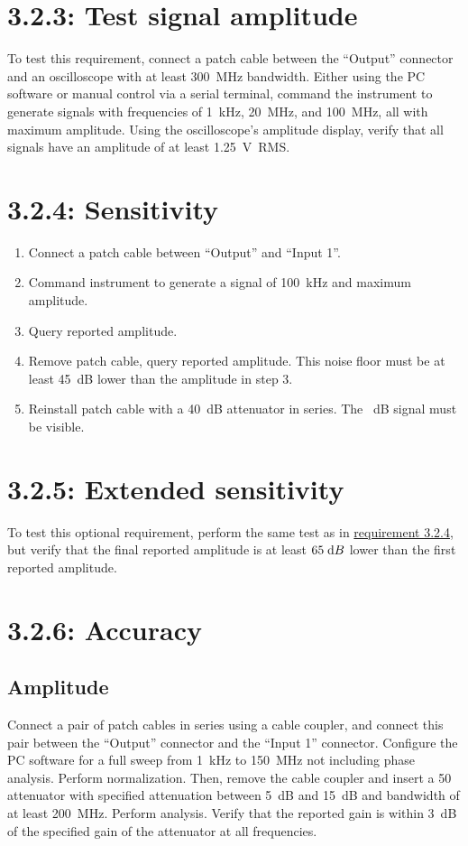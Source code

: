 \section*{3.2.3: Test signal amplitude}
To test this requirement, connect a patch cable between the ``Output'' connector and an
oscilloscope with at least $300$~MHz bandwidth. Either using the PC software or manual control
via a serial terminal, command the instrument to generate signals with frequencies of
1~kHz, 20~MHz, and 100~MHz, all with maximum amplitude. Using the oscilloscope's amplitude
display, verify that all signals have an amplitude of at least 1.25~V~RMS.

\section*{3.2.4: Sensitivity}
\label{tp:3.2.4}
\begin{enumerate}
\item{Connect a patch cable between ``Output'' and ``Input 1''.}
\item{Command instrument to generate a signal of 100~kHz and maximum amplitude.}
\item{Query reported amplitude.}
\item{Remove patch cable, query reported amplitude. This noise floor must be at least 45~dB
    lower than the amplitude in step 3.}
\item{Reinstall patch cable with a 40~dB attenuator in series. The ~dB signal must
    be visible.}
\end{enumerate}

\section*{3.2.5: Extended sensitivity}
To test this optional requirement, perform the same test as in \hyperref[tp:3.2.4]{requirement 3.2.4},
but verify that the final reported amplitude is at least $65\;\mathrm{d}B$ lower than the first reported amplitude.

\section*{3.2.6: Accuracy}
\label{tp:3.2.6}

\subsection*{Amplitude}
Connect a pair of patch cables in series using a cable coupler,
and connect this pair between the ``Output'' connector and the ``Input 1'' connector. Configure
the PC software for a full sweep from 1~kHz to 150~MHz not including phase analysis.
Perform normalization. Then, remove the cable coupler and insert a 50~\Ohm{} attenuator with
specified attenuation between 5~dB and 15~dB and bandwidth of at least 200~MHz.
Perform analysis. Verify that the reported gain is within 3~dB of the specified gain of the
attenuator at all frequencies.

